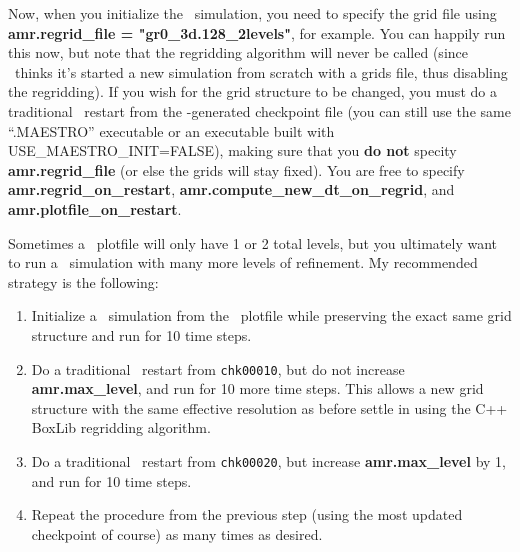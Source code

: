 Now, when you initialize the \castro\ simulation, you need to specify
the grid file using {\bf amr.regrid\_file = "gr0\_3d.128\_2levels"},
for example.  You can happily run this now, but note that the
regridding algorithm will never be called (since \castro\ thinks it's
started a new simulation from scratch with a grids file, thus
disabling the regridding).  If you wish for the grid structure to be
changed, you must do a traditional \castro\ restart from the
\castro-generated checkpoint file (you can still use the same
``.MAESTRO'' executable or an executable built with
USE\_MAESTRO\_INIT=FALSE), making sure that you {\bf do not} specity
{\bf amr.regrid\_file} (or else the grids will stay fixed).  You are
free to specify {\bf amr.regrid\_on\_restart}, {\bf
  amr.compute\_new\_dt\_on\_regrid}, and {\bf
  amr.plotfile\_on\_restart}.

Sometimes a \maestro\ plotfile will only have 1 or 2 total levels, but
you ultimately want to run a \castro\ simulation with many more levels
of refinement.  My recommended strategy is the following:
\begin{enumerate}
\item Initialize a \castro\ simulation from the \maestro\ plotfile
  while preserving the exact same grid structure and run for 10 time
  steps.
\item Do a traditional \castro\ restart from {\tt chk00010}, but do not
  increase {\bf amr.max\_level}, and run for 10 more time steps.  This
  allows a new grid structure with the same effective resolution as
  before settle in using the C++ BoxLib regridding algorithm.
\item Do a traditional \castro\ restart from {\tt chk00020}, but increase
  {\bf amr.max\_level} by 1, and run for 10 time steps.
\item Repeat the procedure from the previous step (using the most
  updated checkpoint of course) as many times as desired.
\end{enumerate}
